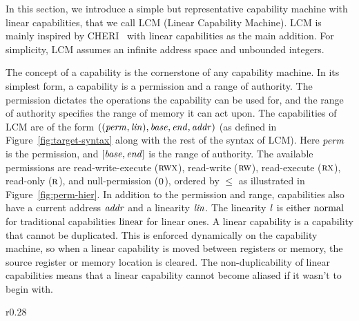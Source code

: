 \documentclass[acmsmall,review,anonymous]{acmart}\settopmatter{printfolios=true,printccs=false,printacmref=false}
\newcommand{\trgcm}{\textsc{LCM}}
\begin{document}
In this section, we introduce a simple but representative capability machine with linear capabilities, that we call \trgcm{} (Linear Capability Machine).
\trgcm{} is mainly inspired by CHERI~\citep{watson_cheri:_2015} with linear capabilities as the main addition.
For simplicity, \trgcm{} assumes an infinite address space and unbounded integers.

The concept of a capability is the cornerstone of any capability machine.
In its simplest form, a capability is a permission and a range of authority.
The permission dictates the operations the capability can be used for, and the range of authority specifies the range of memory it can act upon.
The capabilities of \trgcm{} are of the form $((\mathit{perm},\mathit{lin}),\mathit{base},\mathit{end},\mathit{addr})$ (as defined in Figure~\ref{fig:target-syntax} along with the rest of the syntax of \trgcm{}). Here $\mathit{perm}$ is the permission, and $[\mathit{base},\mathit{end}]$ is the range of authority.
The available permissions are read-write-execute ($\textsc{rwx}$), read-write ($\textsc{rw}$), read-execute ($\textsc{rx}$), read-only ($\textsc{r}$), and null-permission ($\textsc{0}$), ordered by $\le$ as illustrated in Figure~\ref{fig:perm-hier}.
In addition to the permission and range, capabilities also have a current address $\mathit{addr}$ and a linearity $\mathit{lin}$.
The linearity $\mathit{l}$ is either $\mathrm{normal}$ for traditional capabilities $\mathrm{linear}$ for linear ones.
A linear capability is a capability that cannot be duplicated.
This is enforced dynamically on the capability machine, so when a linear capability is moved between registers or memory, the source register or memory location is cleared.
The non-duplicability of linear capabilities means that a linear capability cannot become aliased if it wasn't to begin with.

\begin{wrapfigure}{r}{0.28\linewidth}
  \centering

  \caption{Permission hierarchy}
  \label{fig:perm-hier}
\end{wrapfigure}
\end{document}
